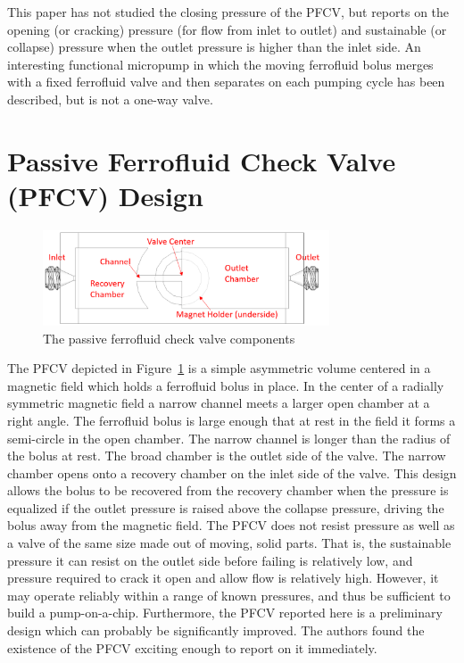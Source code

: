 \documentclass[twocolumn,10pt]{asme2ej}
\begin{document}
This paper has not studied the closing pressure of the PFCV, but reports on
the opening (or cracking) pressure (for flow from inlet to outlet) and
sustainable (or collapse) pressure
when the outlet pressure is higher than the inlet side.
An interesting functional micropump in which the
moving ferrofluid bolus merges with a fixed ferrofluid valve and then
separates on each pumping cycle has been described\cite{hatch2001ferrofluidic},
but is not a one-way valve.

\section{Passive Ferrofluid Check Valve (PFCV) Design}
\begin{figure}
\centerline{\includegraphics[width=3.34in]{figure/TopViewFerrofluidModelLabelled.png}}
\caption{The passive ferrofluid check valve components}
\label{fig_components}
\end{figure}

The PFCV depicted in Figure~\ref{fig_components} is a simple asymmetric volume
centered in a magnetic field
which holds a ferrofluid bolus in place.
In the center of a radially symmetric magnetic field
a narrow channel meets a larger open chamber at a right angle.
The ferrofluid bolus is large enough that at rest in the field it
forms a semi-circle in the open chamber. The narrow channel is
longer than the radius of the bolus at rest.
The broad chamber is the outlet side of the valve.
The narrow chamber opens onto a recovery chamber on the inlet
side of the valve.
This design allows the bolus to be recovered from the recovery
chamber when the pressure is equalized if the outlet pressure is
raised above the collapse pressure, driving the bolus away
from the magnetic field.
The PFCV does not resist pressure as well  as a
valve of the same size
made out of moving, solid parts.
That is, the sustainable
pressure it can resist on the outlet side before failing is relatively
low, and pressure required to crack it open and allow flow is
relatively high.
However, it may operate reliably within a range of
known pressures, and thus be sufficient to build a
pump-on-a-chip.
Furthermore, the PFCV reported here is a preliminary design which
can probably be significantly improved.
The authors found the
existence of the PFCV exciting enough to report on it immediately.
\end{document}
